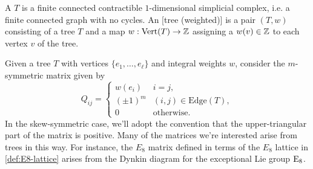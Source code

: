 \begin{definition}
	A  $T$ is a finite connected contractible $1$-dimensional simplicial complex, i.e. a finite connected graph with no cycles. An [tree (weighted)] is a pair $(T,w)$ consisting of a tree $T$ and a map $w : \operatorname{Vert}(T) \to \mathbb{Z}$ assigning a  $w(v)\in \mathbb{Z}$ to each vertex $v$ of the tree.
\end{definition}

Given a tree $T$ with vertices $\{e_1,\ldots, e_\ell\}$ and integral weights $w$, consider the $m$-symmetric matrix given by
\[
	Q_{ij} = \begin{cases}
		w(e_i)    & i=j,                       \\
		(\pm 1)^m & (i,j)\in \textrm{Edge}(T), \\
		0         & \textrm{otherwise}.
	\end{cases}
\]
In the skew-symmetric case, we'll adopt the convention that the upper-triangular part of the matrix is positive. Many of the matrices we're interested arise from trees in this way. For instance, the $E_8$ matrix defined in terms of the $E_8$ lattice in \cref{def:E8-lattice} arises from the Dynkin diagram for the exceptional Lie group $\mathrm{E}_8$.
